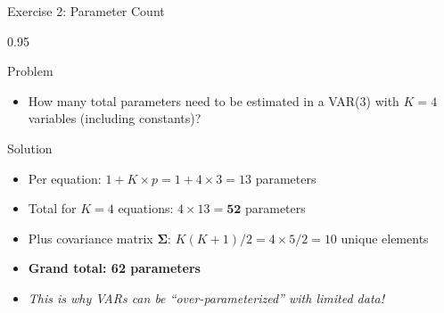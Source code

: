 \documentclass[9pt, aspectratio=169, t]{beamer}
\begin{document}
\begin{frame}{Exercise 2: Parameter Count}
    \begin{cminipage}{0.95\textwidth}
    \begin{alertblock}{Problem}
        \begin{itemize}\setlength{\itemsep}{0pt}
            \item How many total parameters need to be estimated in a VAR(3) with $K=4$ variables (including constants)?
        \end{itemize}
    \end{alertblock}

    \vspace{0.2cm}
    \begin{exampleblock}{Solution}
        \begin{itemize}\setlength{\itemsep}{0pt}
            \item Per equation: $1 + K \times p = 1 + 4 \times 3 = 13$ parameters
            \item Total for $K=4$ equations: $4 \times 13 = \mathbf{52}$ parameters
            \item Plus covariance matrix $\boldsymbol{\Sigma}$: $K(K+1)/2 = 4 \times 5 / 2 = 10$ unique elements
            \item \textbf{Grand total: 62 parameters}
            \item \textit{This is why VARs can be ``over-parameterized'' with limited data!}
        \end{itemize}
    \end{exampleblock}
    \end{cminipage}
\end{frame}
\end{document}
